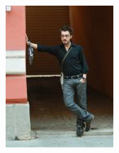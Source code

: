 \begin{figure}[h]
\begin{subfigure}[b]{.2\textwidth}
   \includegraphics[height=\textwidth]{./images/LSP3}
\end{subfigure}
\begin{subfigure}[b]{.15\textwidth}
	\centering

\end{subfigure}
\end{figure}
